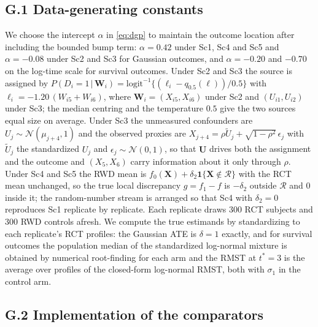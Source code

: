 \documentclass[11pt]{article}
\newcommand{\Normal}{\mathcal{N}}
\newcommand{\logit}{\mathrm{logit}}
\newcommand{\given}{\,\vert\,}
\theoremstyle{definition}
\theoremstyle{plain}
\begin{document}
\subsection*{G.1 Data-generating constants}

We choose the intercept $\alpha$ in \eqref{eq:dgp} to maintain the outcome location after including the bounded bump term: $\alpha=0.42$ under Sc1, Sc4 and Sc5 and $\alpha=-0.08$ under Sc2 and Sc3 for Gaussian outcomes, and $\alpha=-0.20$ and $-0.70$ on the log-time scale for survival outcomes. Under Sc2 and Sc3 the source is assigned by $P(D_i=1\given\bm W_i)=\logit^{-1}\{(\ell_i-q_{0.5}(\ell))/0.5\}$ with $\ell_i=-1.20\,(W_{i5}+W_{i6})$, where $\bm W_i=(X_{i5},X_{i6})$ under Sc2 and $(U_{i1},U_{i2})$ under Sc3; the median centring and the temperature $0.5$ give the two sources equal size on average. Under Sc3 the unmeasured confounders are $U_j\sim\Normal(\mu_{j+4},1)$ and the observed proxies are $X_{j+4}=\rho\tilde U_j+\sqrt{1-\rho^2}\,\epsilon_j$ with $\tilde U_j$ the standardized $U_j$ and $\epsilon_j\sim\Normal(0,1)$, so that $\bm U$ drives both the assignment and the outcome and $(X_5,X_6)$ carry information about it only through $\rho$. Under Sc4 and Sc5 the RWD mean is $f_0(\bm X)+\delta_2\mathbf 1\{\bm X\notin\mathcal R\}$ with the RCT mean unchanged, so the true local discrepancy $g=f_1-f$ is $-\delta_2$ outside $\mathcal R$ and $0$ inside it; the random-number stream is arranged so that Sc4 with $\delta_2=0$ reproduces Sc1 replicate by replicate. Each replicate draws $300$ RCT subjects and $300$ RWD controls afresh. We compute the true estimands by standardizing to each replicate's RCT profiles: the Gaussian ATE is $\delta=1$ exactly, and for survival outcomes the population median of the standardized log-normal mixture is obtained by numerical root-finding for each arm and the RMST at $t^\ast=3$ is the average over profiles of the closed-form log-normal RMST, both with $\sigma_1$ in the control arm.

\subsection*{G.2 Implementation of the comparators}
\end{document}
